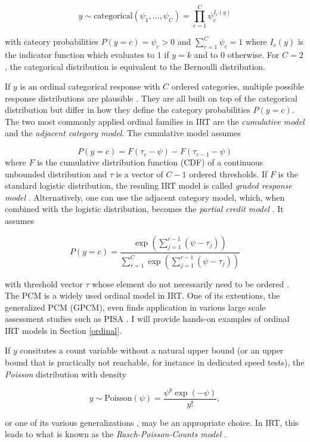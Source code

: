 \documentclass[
]{jss}
\begin{document}
\[
y \sim \text{categorical}(\psi_1, \ldots, \psi_C) = \prod_{c = 1}^C \psi_c^{I_c(y)}
\]

with cateory probabilities \(P(y = c) = \psi_c > 0\) and
\(\sum_{c=1}^C \psi_c = 1\) where \(I_c(y)\) is the indicator function
which evaluates to \(1\) if \(y = k\) and to \(0\) otherwise. For
\(C = 2\), the categorical distribution is equivalent to the Bernoulli
distribution.

If \(y\) is an ordinal categorical response with \(C\) ordered
categories, multiple possible response distributions are plausible
\citep{agresti2010, buerkner2019}. They are all built on top of the
categorical distribution but differ in how they define the category
probabilities \(P(y = c)\). The two most commonly applied ordinal
families in IRT are the \emph{cumulative model} and the \emph{adjacent
category model}. The cumulative model assumes

\[
P(y = c) = F(\tau_c - \psi) - F(\tau_{c-1} - \psi)
\] where \(F\) is the cumulative distribution function (CDF) of a
continuous unbounded distribution and \(\tau\) is a vector of \(C-1\)
ordered thresholds. If \(F\) is the standard logistic distribution, the
resuling IRT model is called \emph{graded response model}
\citep[GRM;][]{samejima1997}. Alternatively, one can use the adjacent
category model, which, when combined with the logistic distribution,
becomes the \emph{partial credit model} \citep[PCM;][]{rasch1961}. It
assumes

\[
P(y = c) = \frac{\exp \left(\sum_{j=1}^{c-1} (\psi -\tau_{j}) \right)}
  {\sum_{r=1}^{C} \exp\left(\sum_{j=1}^{r-1} (\psi -\tau_{j}) \right)}
\]

with threshold vector \(\tau\) whose element do not necessarily need to
be ordered \citep{adams2012}. The PCM is a widely used ordinal model in
IRT. One of its extentions, the generalized PCM (GPCM), even finds
application in various large scale assessment studies such as PISA
\citep{oecd2017}. I will provide hands-on examples of ordinal IRT models
in Section \ref{ordinal}.

If \(y\) consitutes a count variable without a natural upper bound (or
an upper bound that is practically not reachable, for instance in
dedicated speed tests), the \emph{Poisson} distribution with density

\[
y \sim \text{Poisson}(\psi) = \frac{\psi^y \exp(-\psi)}{y!},
\]

or one of its various generalizations \citep[e.g., see][]{shmueli2005},
may be an appropriate choice. In IRT, this leads to what is known as the
\emph{Rasch-Poisson-Counts model} \citep[RPCM;][]{rasch1960}.
\end{document}
